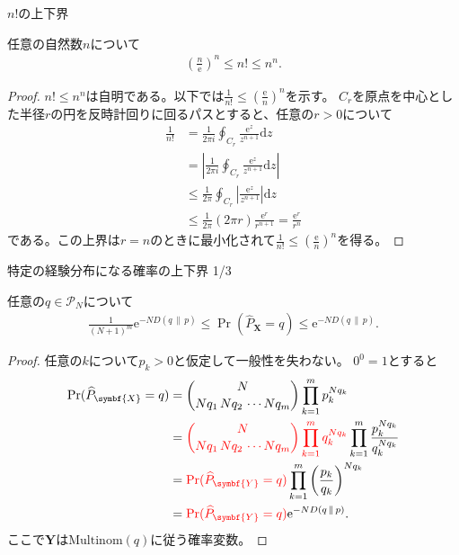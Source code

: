 \documentclass[lualatex,handout]{beamer}
\newcommand{\mycolor}[2]{%
  \begingroup
  \colorlet{currentcolor}{.}%
  \color{#1}#2%
  \color{currentcolor}%
  \endgroup
}
\newcommand{\emm}[1]{\mycolor{red}{#1}}
\newcommand\KL[2]{D\left(#1\,\|\,#2\right)}
\theoremstyle{definition}
\begin{document}
\begin{frame}{$n!$の上下界}
\footnotesize
\begin{lemma}
任意の自然数$n$について
\begin{align*}
\left(\frac{n}{\mathrm{e}}\right)^n\le n!\le n^n.
\end{align*}
\vspace{-1em}
\begin{proof}
$n!\le n^n$は自明である。以下では$\frac1{n!}\le \left(\frac{\mathrm{e}}{n}\right)^n$を示す。
%
$C_r$を原点を中心とした半径$r$の円を反時計回りに回るパスとすると、任意の$r>0$について
\begin{align*}
\frac1{n!} &= \frac1{2\pi i} \oint_{C_r} \frac{\mathrm{e}^z}{z^{n+1}}\mathrm{d}z\\
 &= \left|\frac1{2\pi i} \oint_{C_r} \frac{\mathrm{e}^z}{z^{n+1}}\mathrm{d}z\right|\\
&\le \frac1{2\pi } \oint_{C_r} \left|\frac{\mathrm{e}^z}{z^{n+1}}\right|\mathrm{d}z\\
&\le \frac1{2\pi } (2\pi r) \frac{\mathrm{e}^r}{r^{n+1}} = \frac{\mathrm{e}^r}{r^n}
\end{align*}
である。この上界は$r=n$のときに最小化されて$\frac1{n!}\le\left(\frac{\mathrm{e}}{n}\right)^n$を得る。
\end{proof}
\end{lemma}
\end{frame}
\fi

\begin{frame}{特定の経験分布になる確率の上下界 1/3}
\footnotesize
\begin{lemma}
任意の$q\in\mathcal{P}_N$について
\begin{align*}
\frac1{(N+1)^m}\mathrm{e}^{-N \KL{q}{p}}\le
\Pr(\widehat{P}_{\symbf{X}} = q)
\le \mathrm{e}^{-N \KL{q}{p}}.
\end{align*}
\end{lemma}
\begin{proof}
任意の$k$について$p_k>0$と仮定して一般性を失わない。
$0^0=1$とすると
\begin{align*}
\Pr(\widehat{P}_{\symbf{X}}= q) &= \binom{N}{Nq_1\,Nq_2\,\dotsm Nq_m} \prod_{k=1}^m p_k^{Nq_k}\\
 &= \emm{\binom{N}{Nq_1\,Nq_2\,\dotsm Nq_m} \prod_{k=1}^m q_k^{Nq_k}}\prod_{k=1}^m\frac{p_k^{Nq_k}}{q_k^{Nq_k}}\\
 &= \emm{\Pr(\widehat{P}_{\symbf{Y}}= q)}\prod_{k=1}^m\left(\frac{p_k}{q_k}\right)^{Nq_k}\\
 &=\emm{\Pr(\widehat{P}_{\symbf{Y}}= q)}\mathrm{e}^{-N \KL{q}{p}}.
\end{align*}
ここで$\symbf{Y}$は$\mathrm{Multinom}(q)$に従う確率変数。
\end{proof}
\end{frame}
\end{document}
